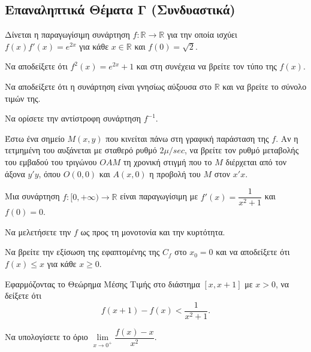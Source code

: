 \documentclass[a4paper,11pt,twoside]{article}
\newcommand{\kerkissans}[1]{{\fontfamily{maksf}\selectfont {#1}}}
\newcommand{\myleftmark}{\leftmark}
\renewcommand{\myleftmark}{{\large Τυπολόγιο}}
\newcommand\thema{Γ}
\newcounter{askhsh}[section]
\renewcommand{\theaskhsh}{\arabic{askhsh}}
\newcommand{\Askhsh}{\refstepcounter{askhsh}{\textbf{\textcolor{black}{\faPenSquare\ \  \large \kerkissans{\textbf{\theaskhshο\hspace{2mm}Θέμα}}}}}\hspace{0mm}}{}
\newenvironment{askhsh}[1]
{\begin{tcolorbox}[title=\Askhsh\kerkissans{\textbf{\large{  #1}}},breakable,
enhanced standard,titlerule=0pt,toprule=0pt, rightrule=0pt, bottomrule=0pt,
colback=white,left=0mm,top=1mm,bottom=0mm,
boxrule=0pt,
colframe=white,leftrule=0mm,sharp corners,coltitle=black]
\renewcommand{\thema}{#1}}
{\end{tcolorbox}}
\begin{document}
\pagestyle{fancy}

\renewcommand{\myleftmark}{\large Τυπολόγιο}
\begin{center}
\part{Επαναληπτικά Θέματα Γ (Συνδυαστικά)}
\end{center}

\begin{askhsh}{Γ}
Δίνεται η παραγωγίσιμη συνάρτηση $f: \mathbb{R} \to \mathbb{R}$ για την οποία ισχύει $f(x)f'(x) = e^{2x}$ για κάθε $x \in \mathbb{R}$ και $f(0) = \sqrt{2}$. 
\begin{erwthma}
  \item Να αποδείξετε ότι $f^2(x) = e^{2x} + 1$ και στη συνέχεια να βρείτε τον τύπο της $f(x)$.
  \item Να αποδείξετε ότι η συνάρτηση είναι γνησίως αύξουσα στο $\mathbb{R}$ και να βρείτε το σύνολο τιμών της.
  \item Να ορίσετε την αντίστροφη συνάρτηση $f^{-1}$.
  \item Έστω ένα σημείο $M(x, y)$ που κινείται πάνω στη γραφική παράσταση της $f$. Αν η τετμημένη του αυξάνεται με σταθερό ρυθμό $2 \mu/\si{sec}$, να βρείτε τον ρυθμό μεταβολής του εμβαδού του τριγώνου $OAM$ τη χρονική στιγμή που το $M$ διέρχεται από τον άξονα $y'y$, όπου $O(0,0)$ και $A(x, 0)$ η προβολή του $M$ στον $x'x$.
\end{erwthma}
\end{askhsh}

\begin{askhsh}{Γ}
Μια συνάρτηση $f: [0, +\infty) \to \mathbb{R}$ είναι παραγωγίσιμη με $f'(x) = \dfrac{1}{x^2+1}$ και $f(0) = 0$.
\begin{erwthma}
  \item Να μελετήσετε την $f$ ως προς τη μονοτονία και την κυρτότητα.
  \item Να βρείτε την εξίσωση της εφαπτομένης της $C_f$ στο $x_0=0$ και να αποδείξετε ότι $f(x) \le x$ για κάθε $x \ge 0$.
  \item Εφαρμόζοντας το Θεώρημα Μέσης Τιμής στο διάστημα $[x, x+1]$ με $x > 0$, να δείξετε ότι \[f(x+1) - f(x) < \dfrac{1}{x^2+1}.\]
  \item Να υπολογίσετε το όριο $\lim\limits_{x \to 0^+} \dfrac{f(x) - x}{x^2}$.
\end{erwthma}
\end{askhsh}
\end{document}
